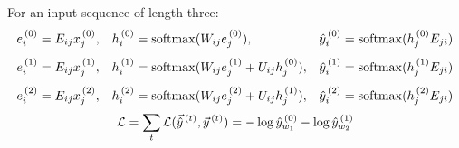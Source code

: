For an input sequence of length three:
\[
  \begin{array}{lll}
    e_i^{\,(0)} = E_{ij} x_j^{\,(0)}
    , &
    h_i^{\,(0)} = \operatorname{softmax}(W_{ij} e_j^{\,(0)})
    , &
    \hat{y}_i^{\,(0)} = \operatorname{softmax}(h_j^{\,(0)} E_{ji})
    \\[2ex]
    e_i^{\,(1)} = E_{ij} x_j^{\,(1)}
    , &
    h_i^{\,(1)} = \operatorname{softmax}(W_{ij} e_j^{\,(1)} + U_{ij} h_j^{\,(0)})
    , &
    \hat{y}_i^{\,(1)} = \operatorname{softmax}(h_j^{\,(1)} E_{ji})
    \\[2ex]
    e_i^{\,(2)} = E_{ij} x_j^{\,(2)}
    , &
    h_i^{\,(2)} = \operatorname{softmax}(W_{ij} e_j^{\,(2)} + U_{ij} h_j^{\,(1)})
    , &
    \hat{y}_i^{\,(2)} = \operatorname{softmax}(h_j^{\,(2)} E_{ji})
  \end{array}
\]
$$
  \mathcal{L} =
  \sum_{t} \mathcal{L}(\vec{\hat{y}}^{\,(t)}, \vec{y}^{\,(t)}) =
  -\log\hat{y}_{w_{1}}^{\,(0)}
  -\log\hat{y}_{w_{2}}^{\,(1)}
$$